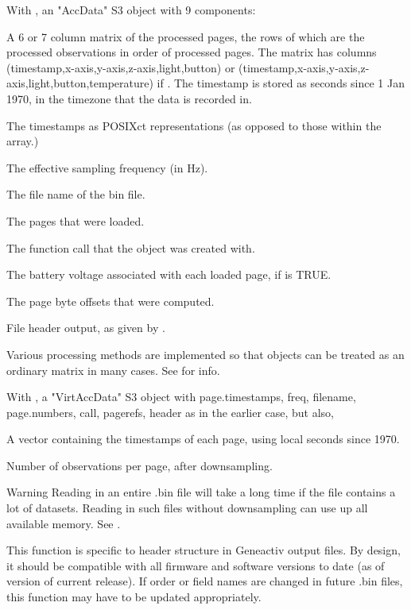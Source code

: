 \documentclass[a4paper]{book}
\begin{document}
%
\begin{Value}
With , an "AccData" S3 object with 9 components:
\begin{ldescription}
\item[\code{data.out}] A 6 or 7 column matrix of the processed pages, the rows of which are the processed observations in order of processed pages.  The matrix has columns (timestamp,x-axis,y-axis,z-axis,light,button) or (timestamp,x-axis,y-axis,z-axis,light,button,temperature) if . The timestamp is stored as seconds since 1 Jan 1970, in the timezone that the data is recorded in.
\item[\code{page.timestamps}] The timestamps as POSIXct representations (as opposed to those within the  array.)
\item[\code{freq}] The effective sampling frequency (in Hz).
\item[\code{filename}] The file name of the bin file.
\item[\code{page.numbers}] The pages that were loaded.
\item[\code{call}] The function call that the object was created with.
\item[\code{page.volts}] The battery voltage associated with each loaded page, if  is TRUE.
\item[\code{pagerefs}] The page byte offsets that were computed.
\item[\code{header}] File header output, as given by .

\end{ldescription}
Various processing methods are implemented so that  objects can be treated as an ordinary matrix in many cases. See  for info.

With , a "VirtAccData" S3 object with page.timestamps, freq, filename, page.numbers, call, pagerefs, header as in the earlier case, but also,
\begin{ldescription}
\item[\code{data.out}] A vector containing the timestamps of each page, using local seconds since 1970.
\item[\code{nobs}] Number of observations per page, after downsampling.
\end{ldescription}
\end{Value}
%
\begin{Section}{Warning}
Reading in an entire .bin file will take a long time if the file contains a lot of datasets. Reading in such files without downsampling can use up all available memory. See .

This function is specific to header structure in Geneactiv output files. By design, it should be compatible with all firmware and software versions to date (as of version of current release). If order or field names are changed in future .bin files, this function may have to be updated appropriately.
\end{Section}
\end{document}
